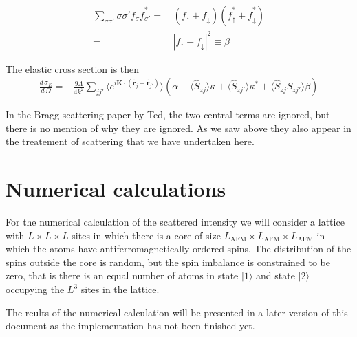 \documentclass[11pt,letter]{article}
\newcommand{\bv}[1]{\ensuremath{\bm{#1}}}
\newcommand{\dsig}[1]{\ensuremath{ \frac{ d\,\sigma_{#1} }{d\,\Omega} }}
\begin{document}
\begin{equation}
\begin{split}
\sum_{\sigma\sigma'} \sigma\sigma' \bar{f}_{\sigma} \bar{f}_{\sigma'}^{*} = &\,
            (\bar{f}_{\uparrow} + \bar{f}_{\downarrow})( \bar{f}_{\uparrow}^{*} + \bar{f}_{\downarrow}^{*} ) \\
       =&\, | \bar{f}_{\uparrow} - \bar{f}_{\downarrow} | ^{2} \equiv \beta
\end{split}
\end{equation}

The elastic cross section is then
\begin{equation}
\begin{split}
\dsig{E} =& \frac{9\Lambda}{4k^{2}}
               \sum_{ j j' } \langle
              e^{ i \bv{K} \cdot ( \hat{\bv{r}}_{j} - \hat{\bv{r}}_{j'} ) } \rangle
             \left( \alpha + \langle \hat{S}_{zj}\rangle \kappa + \langle \hat{S}_{zj'} \rangle \kappa^{*}
                     + \langle \hat{S}_{zj} \hat{S}_{zj'} \rangle \beta \right)
\end{split}
\end{equation}

In the Bragg scattering paper by Ted, the two central terms are ignored, but there is no mention of why they are ignored.  As we saw above they also appear in the treatement of scattering that we have undertaken here.  


\section{Numerical calculations}

For the numerical calculation of the scattered intensity we will consider a
lattice with $L\times L\times L$ sites in which there is a core of size
$L_{\mathrm{AFM}} \times L_{\mathrm{AFM}} \times L_{\mathrm{AFM}}$ in which the
atoms have antiferromagnetically ordered spins.   The distribution of the spins
outside the core is random, but the spin imbalance is constrained to be zero,
that is there is an equal number of atoms in state $|1\rangle$ and state
$|2\rangle $  occupying the $L^{3}$ sites in the lattice. 

The reults of the numerical calculation will be presented in a later version of this document as the implementation has not been finished yet.  
\end{document}
